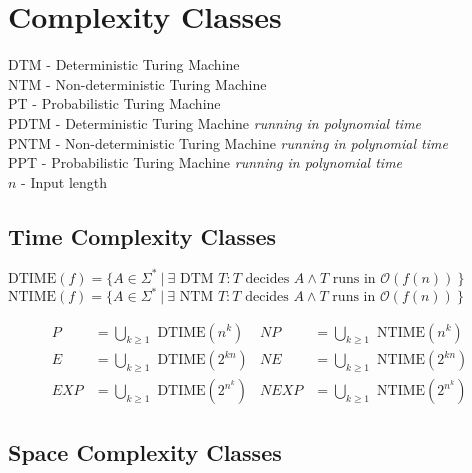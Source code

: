 \documentclass[
    13pt,
    oneside,
    a4paper,
    numbers=enddot,
    abstractoff,
    parskip=full
]{scrreprt}
\begin{document}




\chapter*{Complexity Classes}





DTM - Deterministic Turing Machine\\
NTM - Non-deterministic Turing Machine\\
PT - Probabilistic Turing Machine\\
PDTM - Deterministic Turing Machine \textit{running in polynomial time}\\
PNTM - Non-deterministic Turing Machine \textit{running in polynomial time}\\
PPT - Probabilistic Turing Machine \textit{running in polynomial time}\\
$n$ - Input length




\section*{Time Complexity Classes}
\label{sec:time_complexity_classes}

$\text{DTIME}(f) = \{
    A \in \Sigma^\ast ~|~
    \exists \text{ DTM } T:
    T \text{ decides } A \land
    T \text{ runs in } \mathcal{O}(f(n))
~\}$
$\text{NTIME}(f) = \{
    A \in \Sigma^\ast ~|~
    \exists \text{ NTM } T:
    T \text{ decides } A \land
    T \text{ runs in } \mathcal{O}(f(n))
~\}$


\begin{align*}
        P       &= \bigcup_{k \geq 1} \text{ DTIME}(n^k)
    &   NP      &= \bigcup_{k \geq 1} \text{ NTIME}(n^k)
    \\
        E       &= \bigcup_{k \geq 1} \text{ DTIME}(2^{kn})
    &   NE      &= \bigcup_{k \geq 1} \text{ NTIME}(2^{kn})
    \\
        EXP     &= \bigcup_{k \geq 1} \text{ DTIME}(2^{n^k})
    &   NEXP    &= \bigcup_{k \geq 1} \text{ NTIME}(2^{n^k})
\end{align*}






\section*{Space Complexity Classes}
\label{sec:space_complexity_classes}
\end{document}
